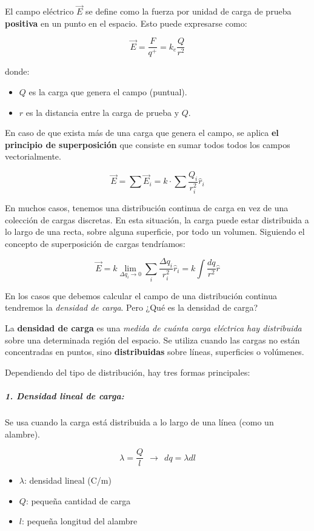 El campo eléctrico \( \vec{E} \) se define como la fuerza por unidad de carga de prueba \textbf{positiva} en un punto en el espacio. Esto puede expresarse como:

\begin{equation}
    \vec{E} = \frac{F}{q^{+}} = k_e \frac{Q}{r^2}
\end{equation}

donde:
\begin{itemize}
    \item \( Q \) es la carga que genera el campo (puntual).
    \item \( r \) es la distancia entre la carga de prueba y \( Q \).
\end{itemize}

En caso de que exista más de una carga que genera el campo, se aplica \textbf{el principio de superposición} que consiste en sumar todos todos los campos vectorialmente.

\[
\vec{E} = \sum{\vec{E}_i} = k \cdot \sum{\frac{Q_i}{r^2_i}} \hat{r}_i
\]

En muchos casos, tenemos una distribución continua de carga en vez de una colección de cargas discretas. En esta situación, la carga puede estar distribuida a lo largo de una recta, sobre alguna superficie, por todo un volumen. Siguiendo el concepto de superposición de cargas tendríamos:

\[
\vec{E} = k \lim_{\Delta q_i \to 0} \sum_i{\frac{\Delta q_i}{r_i^2}\hat{r}_i} = k \int \frac{dq}{r^2} \hat{r}
\]

En los casos que debemos calcular el campo de una distribución continua tendremos la \textit{densidad de carga}. Pero ¿Qué es la densidad de carga?

La \textbf{densidad de carga} es una \textit{medida de cuánta carga eléctrica hay distribuida} sobre una determinada región del espacio. Se utiliza cuando las cargas no están concentradas en puntos, sino \textbf{distribuidas} sobre líneas, superficies o volúmenes.

Dependiendo del tipo de distribución, hay tres formas principales:

\subparagraph{1. Densidad lineal de carga:}

Se usa cuando la carga está distribuida a lo largo de una línea (como un alambre).

\[
\lambda = \frac{Q}{l} ~ ~ \rightarrow ~ ~ dq = \lambda dl
\]

\begin{itemize}
    \item \( \lambda \): densidad lineal (C/m)  
    \item \( Q \): pequeña cantidad de carga  
    \item \( l \): pequeña longitud del alambre  
\end{itemize}

